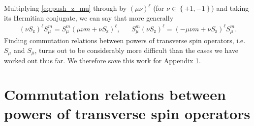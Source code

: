 \documentclass[pra,reprint,longbibliography]{revtex4-1}
\newcommand{\p}[1]{\left(#1\right)} %
\renewcommand{\set}[1]{\left\{#1\right\}} %
\newcommand{\z}{\text{z}}
\newcommand{\bmu}{{\bar\mu}}
\newcommand{\1}{\mathds{1}}
\begin{document}
Multiplying \eqref{eq:push_z_mu} through by $\p{\mu\nu}^\ell$ (for
$\nu\in\set{+1,-1}$) and taking its Hermitian conjugate, we can say
that more generally
\begin{align}
  \p{\nu S_\z}^\ell S_\mu^m
  = S_\mu^m \p{\mu\nu m+\nu S_\z}^\ell,
  &&
  S_\mu^m \p{\nu S_\z}^\ell
  = \p{-\mu\nu m+\nu S_\z}^\ell S_\mu^m.
\end{align}
Finding commutation relations between powers of transverse spin
operators, i.e.~$S_\mu$ and $S_\bmu$, turns out to be considerably
more difficult than the cases we have worked out thus far.  We
therefore save this work for Appendix \ref{sec:comm_transverse}.


\section{Commutation relations between powers of transverse spin
  operators}
\label{sec:comm_transverse}
\end{document}
